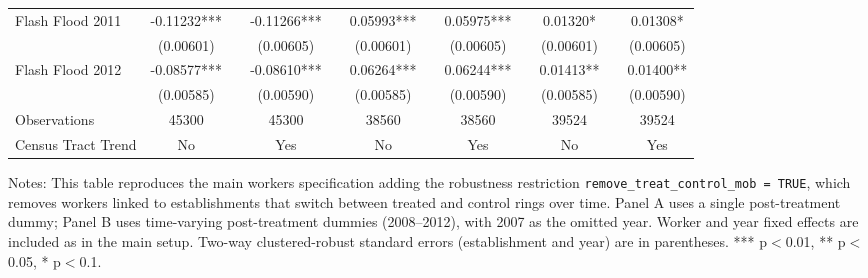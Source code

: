 \begin{table}[htb]
{\begin{threeparttable}
\begin{tabular}{l c p{0.55cm} c p{0.30cm} c p{0.55cm} c p{0.30cm} c p{0.30cm} c}
    Flash Flood 2011 & -0.11232*** & & -0.11266*** & & 0.05993*** & & 0.05975*** & & 0.01320* & & 0.01308*\\
                     & (0.00601) & & (0.00605) & & (0.00601) & & (0.00605) & & (0.00601) & & (0.00605)\\
    Flash Flood 2012 & -0.08577*** & & -0.08610*** & & 0.06264*** & & 0.06244*** & & 0.01413** & & 0.01400**\\
                     & (0.00585) & & (0.00590) & & (0.00585) & & (0.00590) & & (0.00585) & & (0.00590)\\
    \midrule
    Observations & 45300 & & 45300 & & 38560 & & 38560 & & 39524 & & 39524\\
    Census Tract Trend & No & & Yes & & No & & Yes & & No & & Yes\\
    \bottomrule
    \end{tabular}%
    \begin{tablenotes}[flushleft]
    \item \small Notes: This table reproduces the main workers specification adding the robustness restriction \texttt{remove\_treat\_control\_mob = TRUE}, which removes workers linked to establishments that switch between treated and control rings over time. Panel A uses a single post-treatment dummy; Panel B uses time-varying post-treatment dummies (2008--2012), with 2007 as the omitted year. Worker and year fixed effects are included as in the main setup. Two-way clustered-robust standard errors (establishment and year) are in parentheses. *** p$<$0.01, ** p$<$0.05, * p$<$0.1.
    \end{tablenotes}
  \end{threeparttable}
  }
\end{table}
